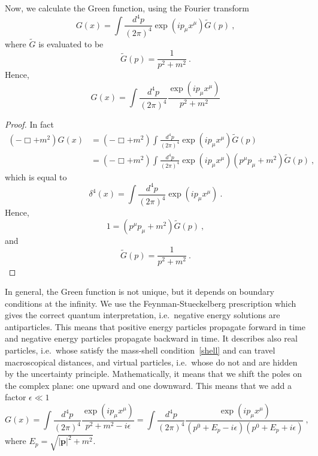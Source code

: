     Now, we calculate the Green function, using the Fourier transform 
    \begin{equation*}
        G(x) = \int \frac{d^4 p}{(2\pi)^4} \exp(i p_\mu x^\mu) \tilde G(p) ~,
    \end{equation*}
    where $\tilde G$ is evaluated to be
    \begin{equation*}
        \tilde G(p) = \frac{1}{p^2 + m^2} ~.
    \end{equation*}
    Hence,
    \begin{equation*}
        G(x) = \int \frac{d^4 p}{(2\pi)^4} \frac{\exp(i p_\mu x^\mu)}{p^2 + m^2}
    \end{equation*}
    \begin{proof}
        In fact 
        \begin{equation*}
        \begin{aligned}
            (- \Box + m^2) G(x) & = (- \Box + m^2) \int \frac{d^4 p}{(2\pi)^4} \exp(i p_\mu x^\mu) \tilde G(p) \\ & = (- \Box + m^2) \int \frac{d^4 p}{(2\pi)^4} \exp(i p_\mu x^\mu) (p^\mu p_\mu + m^2) \tilde G(p) ~,
        \end{aligned}
        \end{equation*}
        which is equal to 
        \begin{equation*}
            \delta^4 (x) = \int \frac{d^4 p}{(2\pi)^4} \exp(i p_\mu x^\mu) ~.
        \end{equation*}
        Hence,
        \begin{equation*}
            1 = (p^\mu p_\mu + m^2) \tilde G(p) ~,
        \end{equation*}
        and
        \begin{equation*}
            \tilde G(p) = \frac{1}{p^2 + m^2} ~.
        \end{equation*}
    \end{proof}

    In general, the Green function is not unique, but it depends on boundary conditions at the infinity. We use the Feynman-Stueckelberg prescription which gives the correct quantum interpretation, i.e.~negative energy solutions are antiparticles. This means that positive energy particles propagate forward in time and negative energy particles propagate backward in time. It describes also real particles, i.e.~whose satisfy the mass-shell condition~\eqref{shell} and can travel macroscopical distances, and virtual particles, i.e.~whose do not and are hidden by the uncertainty principle. Mathematically, it means that we shift the poles on the complex plane: one upward and one downward. This means that we add a factor $\epsilon \ll 1$
    \begin{equation*}
        G(x) = \int \frac{d^4 p}{(2\pi)^4} \frac{\exp(i p_\mu x^\mu)}{p^2 + m^2 - i \epsilon} = \int \frac{d^4 p}{(2\pi)^4} \frac{\exp(i p_\mu x^\mu)}{(p^0 + E_{p} - i \epsilon)(p^0 + E_{p} + i \epsilon)} ~,
    \end{equation*}
    where $E_p = \sqrt{|\mathbf p|^2 + m^2}$.


